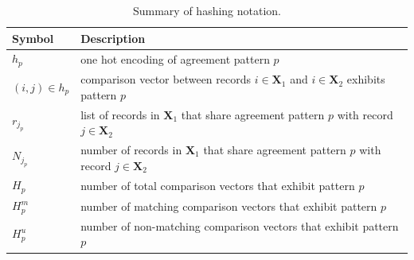 \documentclass[ba]{imsart}
\begin{document}
\begin{table}[t!]
	\centering
	\begin{tabular}[t!]{ll}
		Symbol & Description \\
		\hline
		$h_p$ & one hot encoding of agreement pattern $p$ \\
		$(i,j) \in h_p$ & comparison vector between records $i \in \bm{X}_1$ and $i \in \bm{X}_2$ exhibits pattern $p$ \\
		$r_{j_p}$ & list of records in $\bm{X}_1$ that share agreement pattern $p$ with record $j \in \bm{X}_2$ \\
		$N_{j_p}$ & number of records in $\bm{X}_1$ that share agreement pattern $p$ with record $j \in \bm{X}_2$ \\
		$H_p$ & number of total comparison vectors that exhibit pattern $p$ \\
		$H_p^m$ & number of matching comparison vectors that exhibit pattern $p$ \\
		$H_p^u$ & number of non-matching comparison vectors that exhibit pattern $p$ \\
		\hline
	\end{tabular}\caption{Summary of hashing notation.}\label{table_notation_2}
\end{table}

\end{document}
